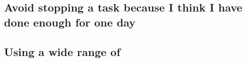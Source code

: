 \documentclass{scrartcl}
\begin{document}







\par






\subsection{Avoid stopping a task because I think I have done enough for one day}






\par



%
\subsection{Using a wide range of }



\par




%
\subsection{ }





\par






%
\end{document}
